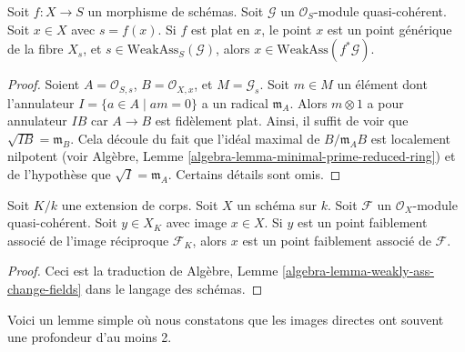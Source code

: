 \begin{lemma}
\label{lemma-weakly-ass-pullback}
Soit  $f : X \to S$  un morphisme de schémas. Soit  $\mathcal{G}$  un
 $\mathcal{O}_S$-module quasi-cohérent. Soit  $x \in X$  avec  $s = f(x)$. Si
 $f$  est plat en  $x$, le point  $x$  est un point
générique de la fibre  $X_s$, et  $s \in \text{WeakAss}_S(\mathcal{G})$, alors  $x \in \text{WeakAss}(f^*\mathcal{G})$.
\end{lemma}

\begin{proof}
Soient  $A = \mathcal{O}_{S, s}$,  $B = \mathcal{O}_{X, x}$, et  $M = \mathcal{G}_s$. Soit  $m \in M$  un élément
dont l’annulateur  $I = \{a \in A \mid am = 0\}$  a un radical  $\mathfrak m_A$. Alors  $m \otimes 1$  a
pour annulateur  $I B$  car  $A \to B$  est fidèlement plat. Ainsi, il
suffit de voir que  $\sqrt{I B} = \mathfrak m_B$. Cela découle du fait que l'idéal maximal de
 $B/\mathfrak m_AB$  est localement nilpotent (voir Algèbre, Lemme  \ref{algebra-lemma-minimal-prime-reduced-ring}) et de
l’hypothèse que  $\sqrt{I} = \mathfrak m_A$. Certains détails sont omis.
\end{proof}

\begin{lemma}
\label{lemma-weakly-ass-change-fields}
Soit  $K/k$  une extension de corps. Soit  $X$  un schéma sur
 $k$. Soit  $\mathcal{F}$  un  $\mathcal{O}_X$-module quasi-cohérent. Soit
 $y \in X_K$  avec image  $x \in X$. Si  $y$  est un point faiblement
associé de l'image réciproque  $\mathcal{F}_K$, alors  $x$  est un point
faiblement associé de  $\mathcal{F}$.
\end{lemma}

\begin{proof}
Ceci est la traduction de Algèbre, Lemme  \ref{algebra-lemma-weakly-ass-change-fields}  dans le langage des schémas.
\end{proof}

\noindent
Voici un lemme simple où nous constatons que les images directes ont souvent une
profondeur d'au moins 2.

